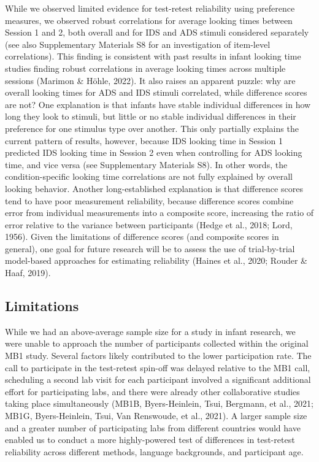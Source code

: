\documentclass[
  man,floatsintext]{apa6}
\begin{document}
While we observed limited evidence for test-retest reliability using preference measures, we observed robust correlations for average looking times between Session 1 and 2, both overall and for IDS and ADS stimuli considered separately (see also Supplementary Materials S8 for an investigation of item-level correlations).
This finding is consistent with past results in infant looking time studies finding robust correlations in average looking times across multiple sessions (Marimon \& Höhle, 2022).
It also raises an apparent puzzle: why are overall looking times for ADS and IDS stimuli correlated, while difference scores are not?
One explanation is that infants have stable individual differences in how long they look to stimuli, but little or no stable individual differences in their preference for one stimulus type over another.
This only partially explains the current pattern of results, however, because IDS looking time in Session 1 predicted IDS looking time in Session 2 even when controlling for ADS looking time, and vice versa (see Supplementary Materials S8).
In other words, the condition-specific looking time correlations are not fully explained by overall looking behavior.
Another long-established explanation is that difference scores tend to have poor measurement reliability, because difference scores combine error from individual measurements into a composite score, increasing the ratio of error relative to the variance between participants (Hedge et al., 2018; Lord, 1956).
Given the limitations of difference scores (and composite scores in general), one goal for future research will be to assess the use of trial-by-trial model-based approaches for estimating reliability (Haines et al., 2020; Rouder \& Haaf, 2019).

\hypertarget{limitations}{%
\subsection{Limitations}\label{limitations}}

While we had an above-average sample size for a study in infant research, we were unable to approach the number of participants collected within the original MB1 study.
Several factors likely contributed to the lower participation rate.
The call to participate in the test-retest spin-off was delayed relative to the MB1 call, scheduling a second lab visit for each participant involved a significant additional effort for participating labs, and there were already other collaborative studies taking place simultaneously (MB1B, Byers-Heinlein, Tsui, Bergmann, et al., 2021; MB1G, Byers-Heinlein, Tsui, Van Renswoude, et al., 2021).
A larger sample size and a greater number of participating labs from different countries would have enabled us to conduct a more highly-powered test of differences in test-retest reliability across different methods, language backgrounds, and participant age.
\end{document}
